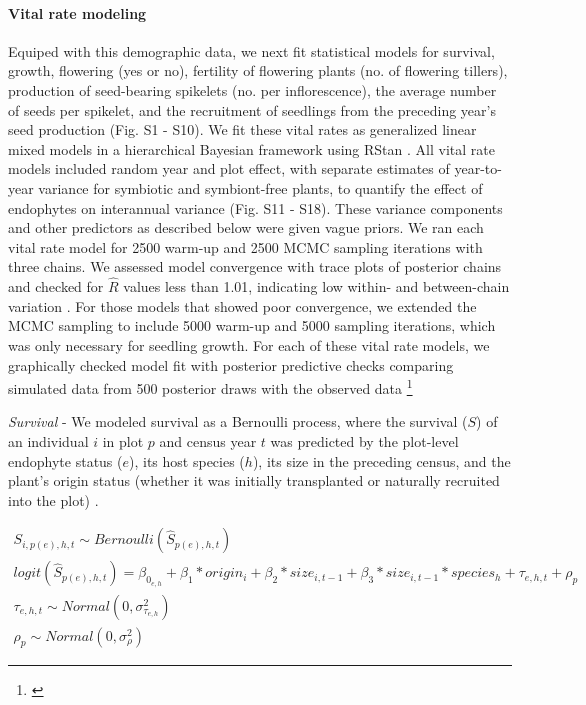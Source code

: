 \documentclass[12pt]{article}
\newcommand{\tom}[2]{{\color{red}{#1}}\footnote{\textit{\color{red}{#2}}}}
\begin{document}
\paragraph*{Vital rate modeling}
Equiped with this demographic data, we next fit statistical models for survival, growth, flowering (yes or no), fertility of flowering plants (no. of flowering tillers),  production of seed-bearing spikelets (no. per inflorescence), the average number of seeds per spikelet, and the recruitment of seedlings from the preceding year's seed production (Fig. S1 - S10).  
We fit these vital rates as generalized linear mixed models in a hierarchical Bayesian framework  using RStan \cite{rstan2022}. 
All vital rate models included random year and plot effect, with separate estimates of year-to-year variance for symbiotic and symbiont-free plants, to quantify the effect of endophytes on interannual variance (Fig. S11 - S18).
These variance components and other predictors as described below were given vague priors.
We ran each vital rate model for 2500 warm-up and 2500 MCMC sampling iterations with three chains. 
We assessed model convergence with trace plots of posterior chains and checked for $\hat{R}$ values less than 1.01, indicating low within- and between-chain variation \cite{brooks1998general,gelman2006data}. 
For those models that showed poor convergence, we extended the MCMC sampling to include 5000 warm-up and 5000 sampling iterations, which was only necessary for seedling growth. 
For each of these vital rate models, we graphically checked model fit with posterior predictive checks comparing simulated data from 500 posterior draws with the observed data \tom{(Fig. S19-S20).}{It's a litte weird to show these aggregated across species.}

\emph{Survival} - We modeled survival as a Bernoulli process, where the survival ($S$) of an individual $i$ in plot $p$ and census year $t$ was predicted by the plot-level endophyte status ($e$), its host species ($h$), its size in the preceding census, and the plant's origin status (whether it was initially transplanted or naturally recruited into the plot) .

\begin{subequations}
	\label{eq:survival}
	\begin{align}
	    S_{i,p(e),h,t} \sim Bernoulli(\hat{S}_{p(e),h,t})\\
	    logit(\hat{S}_{p(e),h,t}) = \beta_{0_{e,h}} + \beta_{1}*origin_{i} + \beta_{2}*size_{i,t-1} + \beta_{3}*size_{i,t-1}*species_{h} + \tau_{e,h,t} + \rho_{p}\\
	    \tau_{e,h,t} \sim Normal(0,\sigma^2_{\tau_{e,h}})\\
	    \rho_{p} \sim Normal(0,\sigma^2_{\rho})
	\end{align}
\end{subequations}
\end{document}
